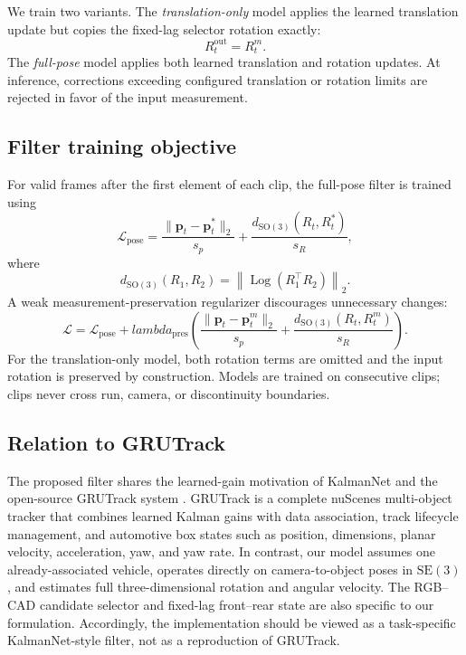 \documentclass[10pt,twocolumn]{article}
\newcommand{\SE}{\mathrm{SE}(3)}
\newcommand{\SO}{\mathrm{SO}(3)}
\newcommand{\Log}{\operatorname{Log}}
\begin{document}
We train two variants. The \emph{translation-only} model applies the learned
translation update but copies the fixed-lag selector rotation exactly:
\begin{equation}
R_t^{\mathrm{out}}=R_t^m.
\end{equation}
The \emph{full-pose} model applies both learned translation and rotation
updates. At inference, corrections exceeding configured translation or
rotation limits are rejected in favor of the input measurement.

\subsection{Filter training objective}

For valid frames after the first element of each clip, the full-pose filter is
trained using
\begin{equation}
\mathcal{L}_{\mathrm{pose}}=
\frac{\|\bm{p}_t-\bm{p}_t^{*}\|_2}{s_p}
+\frac{d_{\SO}(R_t,R_t^{*})}{s_R},
\end{equation}
where
\begin{equation}
d_{\SO}(R_1,R_2)=
\left\|\Log(R_1^{\top}R_2)\right\|_2.
\end{equation}
A weak measurement-preservation regularizer discourages unnecessary changes:
\begin{equation}
\mathcal{L}=\mathcal{L}_{\mathrm{pose}}+lambda_{\mathrm{pres}}
\left(
\frac{\|\bm{p}_t-\bm{p}_t^m\|_2}{s_p}+
\frac{d_{\SO}(R_t,R_t^m)}{s_R}
\right).
\end{equation}
For the translation-only model, both rotation terms are omitted and the input
rotation is preserved by construction. Models are trained on consecutive
clips; clips never cross run, camera, or discontinuity boundaries.

\subsection{Relation to GRUTrack}

The proposed filter shares the learned-gain motivation of KalmanNet and the
open-source GRUTrack system \cite{grutrack2025}. GRUTrack is a complete
nuScenes multi-object tracker that combines learned Kalman gains with data
association, track lifecycle management, and automotive box states such as
position, dimensions, planar velocity, acceleration, yaw, and yaw rate. In
contrast, our model assumes one already-associated vehicle, operates directly
on camera-to-object poses in $\SE$, and estimates full three-dimensional
rotation and angular velocity. The RGB--CAD candidate selector and fixed-lag
front--rear state are also specific to our formulation. Accordingly, the
implementation should be viewed as a task-specific KalmanNet-style filter,
not as a reproduction of GRUTrack.
\end{document}
